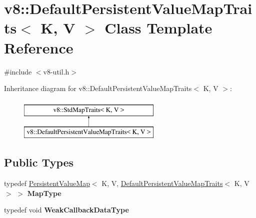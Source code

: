 \hypertarget{classv8_1_1DefaultPersistentValueMapTraits}{}\section{v8\+:\+:Default\+Persistent\+Value\+Map\+Traits$<$ K, V $>$ Class Template Reference}
\label{classv8_1_1DefaultPersistentValueMapTraits}


{\ttfamily \#include $<$v8-\/util.\+h$>$}

Inheritance diagram for v8\+:\+:Default\+Persistent\+Value\+Map\+Traits$<$ K, V $>$\+:\begin{figure}[H]
\begin{center}
\leavevmode
\includegraphics[height=2.000000cm]{classv8_1_1DefaultPersistentValueMapTraits}
\end{center}
\end{figure}
\subsection*{Public Types}
\begin{DoxyCompactItemize}
\item 
\mbox{\label{classv8_1_1DefaultPersistentValueMapTraits_a05cbd536d6bb9ba4949198351e074854}} 
typedef \mbox{\hyperlink{classv8_1_1PersistentValueMap}{Persistent\+Value\+Map}}$<$ K, V, \mbox{\hyperlink{classv8_1_1DefaultPersistentValueMapTraits}{Default\+Persistent\+Value\+Map\+Traits}}$<$ K, V $>$ $>$ {\bfseries Map\+Type}
\item 
\mbox{\label{classv8_1_1DefaultPersistentValueMapTraits_a379f8c42e727a9576fb0954bb0245d8f}} 
typedef void {\bfseries Weak\+Callback\+Data\+Type}
\end{DoxyCompactItemize}
